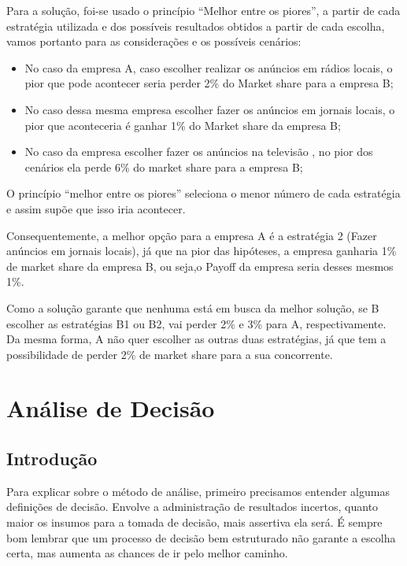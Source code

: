 \documentclass[
	12pt,				%
	openright,			%
	oneside,			%
	a4paper,			%
	english,			%
	french,				%
	spanish,			%
	brazil				%
	]{abntex2}
\begin{document}
 Para a solução, foi-se usado o princípio “Melhor entre os piores”, a partir de cada estratégia utilizada e dos possíveis resultados obtidos a partir de cada escolha, vamos portanto para as considerações e os possíveis cenários:

\begin{itemize}
\item No caso da empresa A, caso escolher realizar os anúncios em rádios locais, o pior que pode acontecer seria perder 2\% do Market share para a empresa B;
\item No caso dessa mesma empresa escolher fazer os anúncios em jornais locais, o pior que aconteceria é ganhar 1\% do Market share da empresa B;
\item No caso da empresa escolher fazer os anúncios na televisão , no pior dos cenários ela perde 6\% do market share para a empresa B;
\end{itemize}

O princípio “melhor entre os piores” seleciona o menor número de cada estratégia e assim supõe que isso iria acontecer.

Consequentemente, a melhor opção para a empresa A é a estratégia 2 (Fazer anúncios em jornais locais), já que na pior das hipóteses, a empresa ganharia 1\% de market share da empresa B, ou seja,o Payoff da empresa seria desses mesmos 1\%.

Como a solução garante que nenhuma está em busca da melhor solução, se B escolher as estratégias B1 ou B2, vai perder 2\% e 3\% para A, respectivamente. Da mesma forma, A não quer escolher as outras duas estratégias, já que tem a possibilidade de perder 2\% de market share para a sua concorrente. \cite{teoriadosjogos}

\part{Análise de Decisão}

\chapter{Introdução}

Para explicar sobre o método de análise, primeiro precisamos entender algumas definições de decisão. Envolve a administração de resultados incertos, quanto maior os insumos para a tomada de decisão, mais assertiva ela será. É sempre bom lembrar que um processo de decisão bem estruturado não garante a escolha certa, mas aumenta as chances de ir pelo melhor caminho. \cite{introduction}
\end{document}
